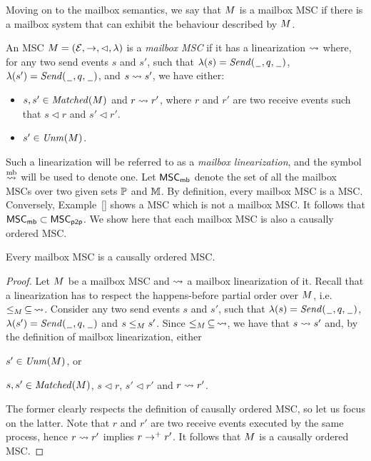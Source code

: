 \documentclass{article}
\begin{document}
\medskip

Moving on to the mailbox semantics, we say that $M$ is a mailbox MSC if there is a mailbox system that can exhibit the behaviour described by $M$. 

\begin{definition}\label{def:mb_msc}
An MSC $M = (\mathcal{E},\to,\lhd,\lambda)$ is a \emph{mailbox MSC} if it has a linearization $\rightsquigarrow$ where, for any two send events $s$ and $s'$, such that $\lambda(s)={\mathit{Send}(\hspace{0.1em}\underline{\hspace{0.5em}}\hspace{0.1em},q,\hspace{0.1em}\underline{\hspace{0.5em}}\hspace{0.1em})}$, $\lambda(s')={\mathit{Send}(\hspace{0.1em}\underline{\hspace{0.5em}}\hspace{0.1em},q,\hspace{0.1em}\underline{\hspace{0.5em}}\hspace{0.1em})}$, and $s \rightsquigarrow s'$, we have either:
\begin{itemize}\itemsep=0.5ex
	\item $s,s' \in \mathit{Matched}(M)$ and $r \rightsquigarrow r'$, where $r$ and $r'$ are two receive events such that $s \lhd r$ and $s' \lhd r'$.
	\item $s' \in \mathit{Unm}(M)$.
\end{itemize}
\end{definition}

Such a linearization will be referred to as a \emph{mailbox linearization}, and the symbol $\overset{\text{mb}}{\rightsquigarrow}$ will be used to denote one. Let $\mathsf{MSC}_{\mathsf{mb}}$ denote the set of all the mailbox MSCs over two given sets $\mathbb{P}$ and $\mathbb{M}$. By definition, every mailbox MSC is a \pp MSC. Conversely, Example~\ref{} shows a \pp MSC which is not a mailbox MSC. It follows that $\mathsf{MSC}_{\mathsf{mb}} \subset \mathsf{MSC}_{\mathsf{p2p}}$. We show here that each mailbox MSC is also a causally ordered MSC.

\begin{proposition}\label{prop:mb_is_co}
	Every mailbox MSC is a causally ordered MSC.
\end{proposition}
\begin{proof}
Let $M$ be a mailbox MSC and $\rightsquigarrow$ a mailbox linearization of it. Recall that a linearization has to respect the happens-before partial order over $M$, i.e. $\le_M \,\subseteq\, \rightsquigarrow$. Consider any two send events $s$ and $s'$, such that $\lambda(s)={\mathit{Send}(\hspace{0.1em}\underline{\hspace{0.5em}}\hspace{0.1em},q,\hspace{0.1em}\underline{\hspace{0.5em}}\hspace{0.1em})}$, $\lambda(s')={\mathit{Send}(\hspace{0.1em}\underline{\hspace{0.5em}}\hspace{0.1em},q,\hspace{0.1em}\underline{\hspace{0.5em}}\hspace{0.1em})}$ and $s \le_M s'$. Since $\le_M \,\subseteq\, \rightsquigarrow$, we have that $s \rightsquigarrow s'$ and, by the definition of mailbox linearization, either
\begin{enumerate*}[label={(\roman*)}]
	\item $s' \in \mathit{Unm}(M)$, or 
	\item $s,s' \in \mathit{Matched}(M)$, $s \lhd r$, $s' \lhd r'$ and $r \rightsquigarrow r'$. 
\end{enumerate*}
The former clearly respects the definition of causally ordered MSC, so let us focus on the latter. Note that $r$ and $r'$ are two receive events executed by the same process, hence $r \rightsquigarrow r'$ implies $r \to^+ r'$. It follows that $M$ is a causally ordered MSC.
\end{proof}
\end{document}
